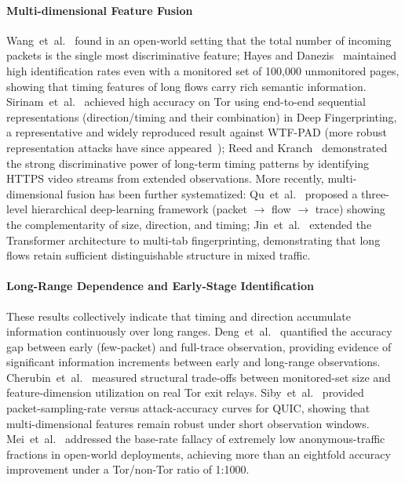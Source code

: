 \documentclass[lettersize,journal]{IEEEtran}
\begin{document}
\paragraph{Multi-dimensional Feature Fusion}
Wang~et~al.~\cite{wang2014effective} found in an open-world setting that
the total number of incoming packets is the single most discriminative
feature; Hayes and Danezis~\cite{hayes2016kfingerprinting} maintained
high identification rates even with a monitored set of 100,000 unmonitored
pages, showing that timing features of long flows carry rich semantic
information.
Sirinam~et~al.~\cite{sirinam2018deep} achieved high accuracy on Tor using
end-to-end sequential representations (direction/timing and their
combination) in Deep Fingerprinting, a representative and widely reproduced
result against WTF-PAD (more robust representation attacks have since
appeared~\cite{shen2023subverting});
Reed and Kranch~\cite{reed2017netflix} demonstrated the strong
discriminative power of long-term timing patterns by identifying HTTPS
video streams from extended observations.
More recently, multi-dimensional fusion has been further systematized:
Qu~et~al.~\cite{qu2023hierarchical} proposed a three-level hierarchical
deep-learning framework (packet $\to$ flow $\to$ trace) showing the
complementarity of size, direction, and timing;
Jin~et~al.~\cite{jin2023transformer} extended the Transformer architecture
to multi-tab fingerprinting, demonstrating that long flows retain
sufficient distinguishable structure in mixed traffic.

\paragraph{Long-Range Dependence and Early-Stage Identification}
These results collectively indicate that timing and direction accumulate
information continuously over long ranges.
Deng~et~al.~\cite{deng2024earlystage} quantified the accuracy gap between
early (few-packet) and full-trace observation, providing evidence of
significant information increments between early and long-range observations.
Cherubin~et~al.~\cite{cherubin2022online} measured structural trade-offs
between monitored-set size and feature-dimension utilization on real Tor
exit relays.
Siby~et~al.~\cite{siby2023quic} provided packet-sampling-rate versus
attack-accuracy curves for QUIC, showing that multi-dimensional features
remain robust under short observation windows.
Mei~et~al.~\cite{mei2025high} addressed the base-rate fallacy of extremely
low anonymous-traffic fractions in open-world deployments, achieving more
than an eightfold accuracy improvement under a
Tor/non-Tor ratio of 1:1000.
\end{document}
